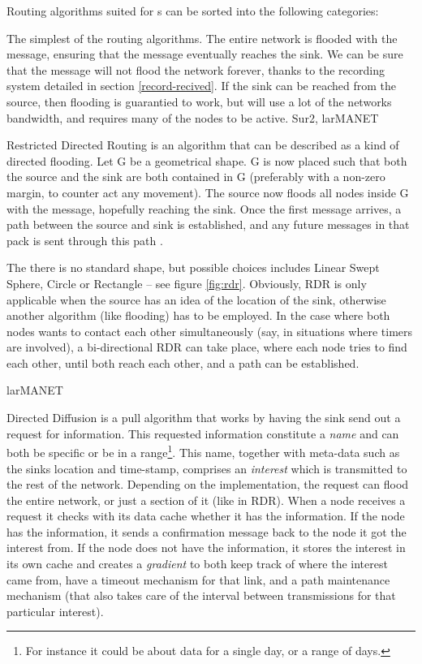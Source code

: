 Routing algorithms suited for \manet s can be sorted into the following categories:
\begin{description}
{The simplest of the routing algorithms. The entire network is flooded with the message, ensuring that the message eventually reaches the sink. We can be sure that the message will not flood the network forever, thanks to the recording system detailed in section \ref{record-recived}. If the sink can be reached from the source, then flooding is  guarantied to work, but will use a lot of the networks bandwidth, and requires many of the nodes to be active.}
{Sur2, larMANET} 


      {Restricted Directed Routing is an algorithm that can be described as a kind of directed flooding. Let G be a geometrical shape. G is now placed such that both the source and the sink are both contained in G (preferably with a non-zero margin, to counter act any movement). The source now floods all nodes inside G with the message, hopefully reaching the sink. Once the first message arrives, a path between the source and sink is established, and any future messages in that pack is sent through this path .

The there is no standard shape, but possible choices includes Linear Swept Sphere, Circle or Rectangle -- see figure \ref{fig:rdr}. Obviously, RDR is only applicable when the source has an idea of the location of the sink, otherwise another algorithm (like flooding) has to be employed. In the case where both nodes wants to contact each other simultaneously (say, in situations where timers are involved), a bi-directional RDR can take place, where each node tries to find each other, until both reach each other, and a path can be established.}
{larMANET}

{Directed Diffusion is a pull algorithm that works by having the sink send out a request for information. This requested information constitute a \emph{name} and can both be specific or be in a range\footnote{For instance it could be about data for a single day, or a range of days.}. This name, together with meta-data such as the sinks location and time-stamp, comprises an \emph{interest} which is transmitted to the rest of the network. Depending on the implementation, the request can flood the entire network, or just a section of it (like in RDR). When a node receives a request it checks with its data cache whether it has the information. If the node has the information, it sends a confirmation message back to the node it got the interest from. If the node does not have the information, it stores the interest in its own cache and creates a \emph{gradient} to both keep track of where the interest came from, have a timeout mechanism for that link, and a path maintenance mechanism (that also takes care of the interval between transmissions for that particular interest). 

}
\end{description}
